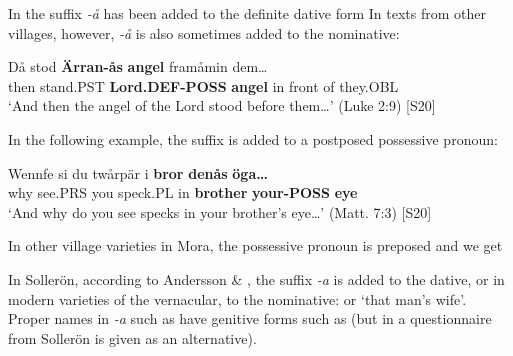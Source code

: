 {{%
In  the suffix\textit{ {}-å} has been added to the definite dative form In texts from other villages, however,\textit{ {}-å} is also sometimes added to the nominative:


\ea\label{}
\gll Då  stod  \textbf{Ärran-ås}\textbf{  angel} framåmin  dem…\\
then  stand.PST  \textbf{Lord.DEF-POSS} \textbf{angel} in front of  they.OBL\\
\glt ‘And then the angel of the Lord stood before them…’ (Luke 2:9) [S20]
\z

In the following example, the suffix is added to a postposed possessive pronoun:


\ea\label{}
\gll Wennfe  si  du  twårpär  i  \textbf{bror}\textbf{  denås}\textbf{  öga…}\\
why  see.PRS  you  speck.PL  in  \textbf{brother} \textbf{your-POSS} \textbf{eye}\\
\glt ‘And why do you see specks in your brother’s eye…’ (Matt. 7:3) [S20]
\z

In other village varieties in Mora, the possessive pronoun is preposed and we get 


In Sollerön, according to Andersson \& \citet[357]{Danielsson1999}, the suffix\textit{ {}-a} is added to the dative, or in modern varieties of the vernacular, to the nominative:  or  ‘that man’s wife’. Proper names in\textit{ {}-a} such as  have genitive forms such as (but in a questionnaire from Sollerön  is given as an alternative).

}}
